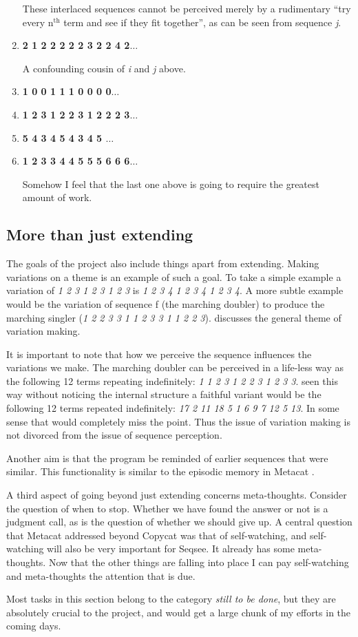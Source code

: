 \begin{enumerate}
These interlaced sequences cannot be perceived merely by a rudimentary ``try every n$^\mathrm{th}$ term and see if they fit together'', as can be seen from sequence \emph{j}.

\item \textbf{ 2 1 2 2 2 2 2 3 2 2 4 2$\ldots$}

A confounding cousin of \emph{i} and \emph{j} above.

\item \textbf{ 1 0 0 1 1 1 0 0 0 0$\ldots$}
\item \textbf{ 1 2 3 1 2 2 3 1 2 2 2 3$\ldots$}
\item \textbf{ 5 4 3 4 5 4 3 4 5 $\ldots$}
\item \textbf{ 1 2 3 3 4 4 5 5 5 6 6 6$\ldots$}

Somehow I feel that the last one above is going to require the greatest amount of work.
\end{enumerate}

\subsection{More than just extending}
\label{sec:more}
The goals of the project also include things apart from extending.  Making variations on a theme is an example of such a goal.  To take a simple example a variation of \emph{1 2 3 1 2 3 1 2 3} is \emph{1 2 3 4 1 2 3 4 1 2 3 4}.  A more subtle example would be the variation of  sequence f (the marching doubler) to produce the marching singler (\emph{1 2 2 3 3 1 1 2 3 3 1 1 2 2 3}).  discusses the general theme of variation making.

It is important to note that how we perceive the sequence influences the variations we make.  The marching doubler can be perceived in a life-less way as the following 12 terms repeating indefinitely: \emph{1 1 2 3 1 2 2 3 1 2 3 3}.  seen this way without noticing the internal structure a faithful variant would be the following 12 terms repeated indefinitely: \emph{17 2 11 18 5 1 6 9 7 12 5 13}. In some sense that would completely miss the point. Thus the issue of variation making is not divorced from the issue of sequence perception.

Another aim is that the program be reminded of earlier sequences that were similar.  This functionality is similar to the episodic memory in Metacat \cite{Marshall}.

A third aspect of going beyond just extending concerns meta-thoughts.  Consider the question of when to stop.  Whether we have found the answer or not is a judgment call, as is the question of whether we should give up. A central question that Metacat addressed beyond Copycat was that of self-watching, and self-watching will also be very important for Seqsee. It already has some meta-thoughts. Now that the other things are falling into place I can pay self-watching and meta-thoughts the attention that is due. 

Most tasks in this section belong to the category \emph{still to be done}, but they are absolutely crucial to the project, and would get a large chunk of my efforts in the coming days.
